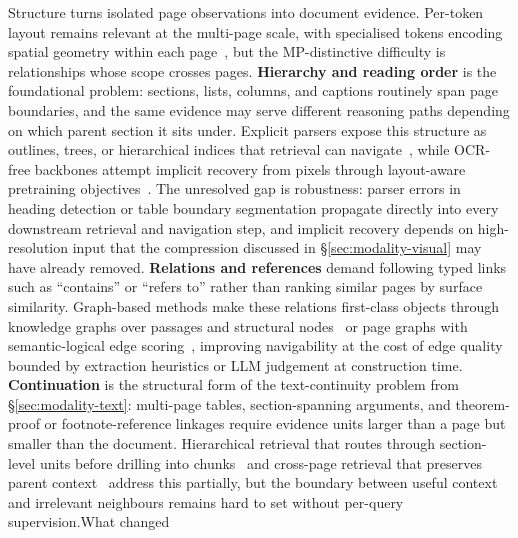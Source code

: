 \documentclass[11pt]{article}
\begin{document}
Structure turns isolated page observations into document evidence. Per-token layout remains relevant at the multi-page scale, with specialised tokens encoding spatial geometry within each page~\cite{zhu2025laytokenllm}, but the MP-distinctive difficulty is relationships whose scope crosses pages. \textbf{Hierarchy and reading order} is the foundational problem: sections, lists, columns, and captions routinely span page boundaries, and the same evidence may serve different reasoning paths depending on which parent section it sits under. Explicit parsers expose this structure as outlines, trees, or hierarchical indices that retrieval can navigate~\cite{shin2025multidocfusion,sun2025docagent}, while OCR-free backbones attempt implicit recovery from pixels through layout-aware pretraining objectives~\cite{yu2024texthawk2,hu2025mplugdocowl2}. The unresolved gap is robustness: parser errors in heading detection or table boundary segmentation propagate directly into every downstream retrieval and navigation step, and implicit recovery depends on high-resolution input that the compression discussed in \S\ref{sec:modality-visual} may have already removed. \textbf{Relations and references} demand following typed links such as ``contains'' or ``refers to'' rather than ranking similar pages by surface similarity. Graph-based methods make these relations first-class objects through knowledge graphs over passages and structural nodes~\cite{wang2024knowledge} or page graphs with semantic-logical edge scoring~\cite{wu2025molorag}, improving navigability at the cost of edge quality bounded by extraction heuristics or LLM judgement at construction time. \textbf{Continuation} is the structural form of the text-continuity problem from \S\ref{sec:modality-text}: multi-page tables, section-spanning arguments, and theorem-proof or footnote-reference linkages require evidence units larger than a page but smaller than the document. Hierarchical retrieval that routes through section-level units before drilling into chunks~\cite{gong2025mhierrag} and cross-page retrieval that preserves parent context~\cite{qian2026accurate} address this partially, but the boundary between useful context and irrelevant neighbours remains hard to set without per-query supervision.What changed
\end{document}
